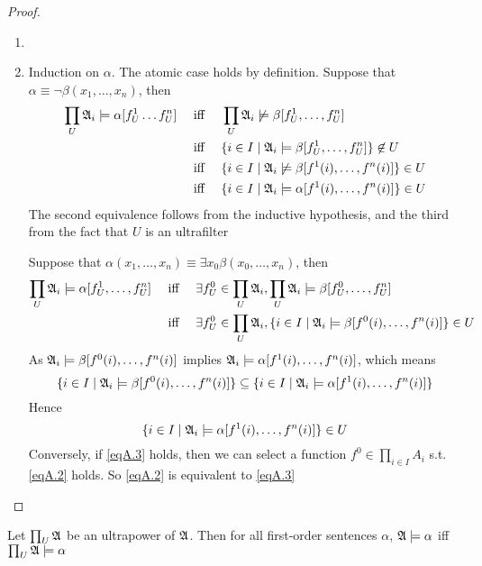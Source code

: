 \documentclass[11pt]{article}
\begin{document}
\begin{proof}
\begin{enumerate}
\item 

\item Induction on \(\alpha\). The atomic case holds by definition. Suppose that
\(\alpha\equiv\neg\beta(x_1,\dots,x_n)\), then
\begin{align*}
\prod_U\mathfrak{A}_i\models\alpha[f_U^1\dots f_U^n]&\quad\text{ iff }\quad
\prod_U\mathfrak{A}_i\not\models\beta[f_U^1,\dots,f_U^n]\\
&\quad\text{ iff }\quad
\{i\in I\mid\mathfrak{A}_i\models\beta[f_U^1,\dots,f_U^n]\}\not\in U\\
&\quad\text{ iff }\quad
\{i\in I\mid\mathfrak{A}_i\not\models\beta[f^1(i),\dots,f^n(i)]\}\in U\\
&\quad\text{ iff }\quad
\{i\in I\mid\mathfrak{A}_i\models\alpha[f^1(i),\dots,f^n(i)]\}\in U
\end{align*}
The second equivalence follows from the inductive hypothesis, and the
third from the fact that \(U\) is an ultrafilter

Suppose that \(\alpha(x_1,\dots,x_n)\equiv\exists x_0\beta(x_0,\dots,x_n)\),
then
\begin{align}
\prod_U\mathfrak{A}_i\models\alpha[f_U^1,\dots,f_U^n]&\quad\text{ iff }\quad
\exists f_U^0\in\prod_U\mathfrak{A}_i,\prod_U\mathfrak{A}_i\models\beta[f_U^0,\dots,f_U^n]\nonumber\\
&\quad\text{ iff }\quad
\exists f_U^0\in\prod_U\mathfrak{A}_i,\{i\in I\mid\mathfrak{A}_i\models\beta[f^0(i),\dots,f^n(i)]\}\in U
\label{eqA.2}
\end{align}
As \(\mathfrak{A}_i\models\beta[f^0(i),\dots,f^n(i)]\) implies
\(\mathfrak{A}_i\models\alpha[f^1(i),\dots,f^n(i)]\), which means
\begin{equation*}
\{i\in I\mid\mathfrak{A}_i\models\beta[f^0(i),\dots,f^n(i)]\}\subseteq
\{i\in I\mid\mathfrak{A}_i\models\alpha[f^1(i),\dots,f^n(i)]\}
\end{equation*}
Hence
\begin{equation}
\{i\in I\mid\mathfrak{A}_i\models\alpha[f^1(i),\dots,f^n(i)]\}\in U\label{eqA.3}
\end{equation}
Conversely, if \eqref{eqA.3} holds, then we can select a function
\(f^0\in\prod_{i\in I}A_i\) s.t. \eqref{eqA.2} holds. So \eqref{eqA.2} is
equivalent to \eqref{eqA.3}
\end{enumerate}
\end{proof}

\begin{corollary}[]
Let \(\prod_U\mathfrak{A}\) be an ultrapower of \(\mathfrak{A}\). Then for all first-order
sentences \(\alpha\), \(\mathfrak{A}\models\alpha\) iff \(\prod_U\mathfrak{A}\models\alpha\)
\end{corollary}
\end{document}
